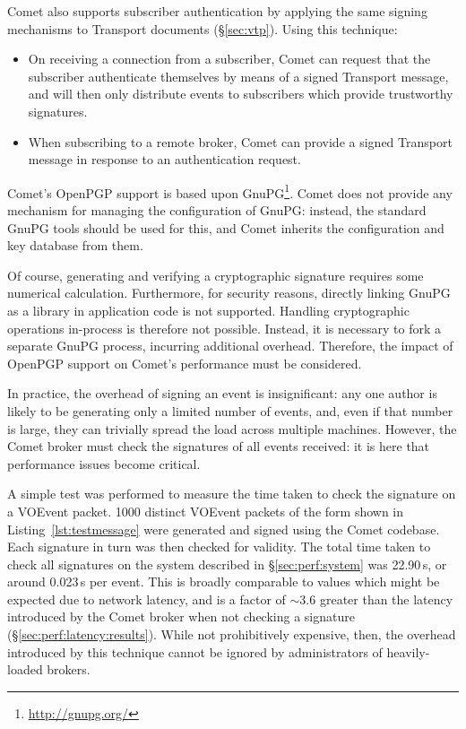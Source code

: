 \documentclass[5p,authoryear]{elsarticle}
\begin{document}
Comet also supports subscriber authentication by applying the same signing
mechanisms to Transport documents (\S\ref{sec:vtp}). Using this technique:

\begin{itemize}

  \item{On receiving a connection from a subscriber, Comet can request that
  the subscriber authenticate themselves by means of a signed Transport
  message, and will then only distribute events to subscribers which provide
  trustworthy signatures.}

  \item{When subscribing to a remote broker, Comet can provide a signed
  Transport message in response to an authentication request.}

\end{itemize}


Comet's OpenPGP support is based upon GnuPG\footnote{\url{http://gnupg.org/}}.
Comet does not provide any mechanism for managing the configuration of GnuPG:
instead, the standard GnuPG tools should be used for this, and Comet inherits
the configuration and key database from them.

Of course, generating and verifying a cryptographic signature requires some
numerical calculation. Furthermore, for security reasons, directly linking
GnuPG as a library in application code is not supported. Handling
cryptographic operations in-process is therefore not possible. Instead, it is
necessary to fork a separate GnuPG process, incurring additional overhead.
Therefore, the impact of OpenPGP support on Comet's performance must be
considered.

In practice, the overhead of signing an event is insignificant: any one author
is likely to be generating only a limited number of events, and, even if that
number is large, they can trivially spread the load across multiple machines.
However, the Comet broker must check the signatures of all events received: it
is here that performance issues become critical.

A simple test was performed to measure the time taken to check the signature
on a VOEvent packet. 1000 distinct VOEvent packets of the form shown in
Listing~\ref{lst:testmessage} were generated and signed using the Comet
codebase. Each signature in turn was then checked for validity. The total
time taken to check all signatures on the system described in
\S\ref{sec:perf:system} was 22.90\,s, or around 0.023\,s per event. This is
broadly comparable to values which might be expected due to network latency,
and is a factor of $\sim3.6$ greater than the latency introduced by the Comet
broker when not checking a signature (\S\ref{sec:perf:latency:results}). While
not prohibitively expensive, then, the overhead introduced by this technique
cannot be ignored by administrators of heavily-loaded brokers.
\end{document}
